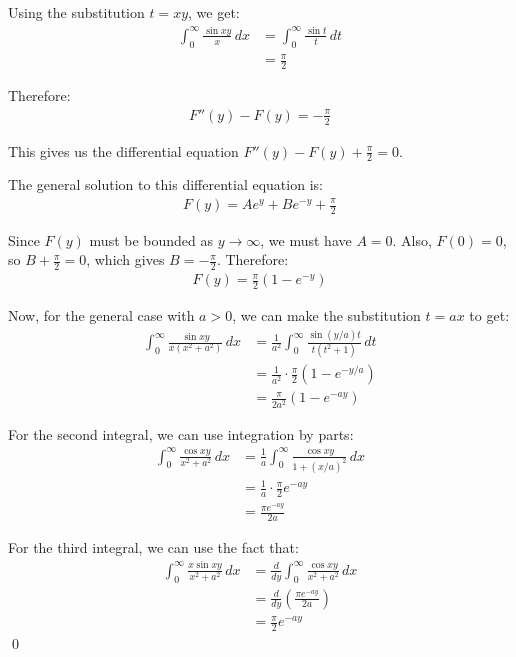 Using the substitution $t = xy$, we get:
\begin{align*}
\int_{0}^{\infty} \frac{\sin xy}{x} \, dx &= \int_{0}^{\infty} \frac{\sin t}{t} \, dt \\
&= \frac{\pi}{2}
\end{align*}

Therefore:
\begin{align*}
F''(y) - F(y) = -\frac{\pi}{2}
\end{align*}

This gives us the differential equation $F''(y) - F(y) + \frac{\pi}{2} = 0$.

The general solution to this differential equation is:
\begin{align*}
F(y) = A e^y + B e^{-y} + \frac{\pi}{2}
\end{align*}

Since $F(y)$ must be bounded as $y \to \infty$, we must have $A = 0$. Also, $F(0) = 0$, so $B + \frac{\pi}{2} = 0$, which gives $B = -\frac{\pi}{2}$. Therefore:
\begin{align*}
F(y) = \frac{\pi}{2} (1 - e^{-y})
\end{align*}

Now, for the general case with $a > 0$, we can make the substitution $t = ax$ to get:
\begin{align*}
\int_{0}^{\infty} \frac{\sin xy}{x(x^2 + a^2)} \, dx &= \frac{1}{a^2} \int_{0}^{\infty} \frac{\sin (y/a)t}{t(t^2 + 1)} \, dt \\
&= \frac{1}{a^2} \cdot \frac{\pi}{2} (1 - e^{-y/a}) \\
&= \frac{\pi}{2a^2} (1 - e^{-ay})
\end{align*}

For the second integral, we can use integration by parts:
\begin{align*}
\int_{0}^{\infty} \frac{\cos xy}{x^2 + a^2} \, dx &= \frac{1}{a} \int_{0}^{\infty} \frac{\cos xy}{1 + (x/a)^2} \, dx \\
&= \frac{1}{a} \cdot \frac{\pi}{2} e^{-ay} \\
&= \frac{\pi e^{-ay}}{2a}
\end{align*}

For the third integral, we can use the fact that:
\begin{align*}
\int_{0}^{\infty} \frac{x \sin xy}{x^2 + a^2} \, dx &= \frac{d}{dy} \int_{0}^{\infty} \frac{\cos xy}{x^2 + a^2} \, dx \\
&= \frac{d}{dy} \left(\frac{\pi e^{-ay}}{2a}\right) \\
&= \frac{\pi}{2} e^{-ay}
\end{align*}\qed


